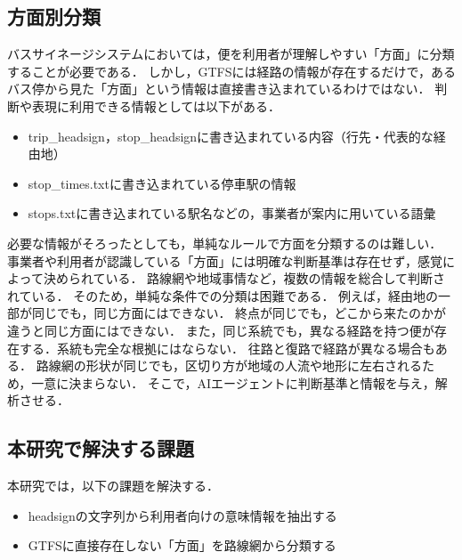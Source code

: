 \subsection{方面別分類}

バスサイネージシステムにおいては，便を利用者が理解しやすい「方面」に分類することが必要である．
しかし，GTFSには経路の情報が存在するだけで，あるバス停から見た「方面」という情報は直接書き込まれているわけではない．
判断や表現に利用できる情報としては以下がある．

\begin{itemize}
    \item trip\_headsign，stop\_headsignに書き込まれている内容（行先・代表的な経由地）
    \item stop\_times.txtに書き込まれている停車駅の情報
    \item stops.txtに書き込まれている駅名などの，事業者が案内に用いている語彙
\end{itemize}

必要な情報がそろったとしても，単純なルールで方面を分類するのは難しい．
事業者や利用者が認識している「方面」には明確な判断基準は存在せず，感覚によって決められている．
路線網や地域事情など，複数の情報を総合して判断されている．
そのため，単純な条件での分類は困難である．
例えば，経由地の一部が同じでも，同じ方面にはできない．
終点が同じでも，どこから来たのかが違うと同じ方面にはできない．
また，同じ系統でも，異なる経路を持つ便が存在する．系統も完全な根拠にはならない．
往路と復路で経路が異なる場合もある．
路線網の形状が同じでも，区切り方が地域の人流や地形に左右されるため，一意に決まらない．
そこで，AIエージェントに判断基準と情報を与え，解析させる．

\subsection{本研究で解決する課題}
本研究では，以下の課題を解決する．

\begin{itemize}
    \item headsignの文字列から利用者向けの意味情報を抽出する
    \item GTFSに直接存在しない「方面」を路線網から分類する
\end{itemize}
